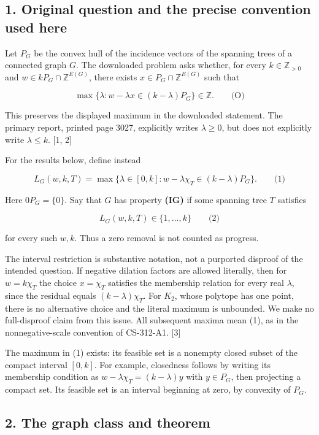 \documentclass{article}
\begin{document}
\subsection{1. Original question and the precise convention used here}

Let \(P_G\) be the convex hull of the incidence vectors of the spanning trees of a connected graph \(G\). The downloaded problem asks whether, for every \(k\in\mathbb Z_{\gt 0}\) and \(w\in kP_G\cap\mathbb Z^{E(G)}\), there exists \(x\in P_G\cap\mathbb Z^{E(G)}\) such that

\[
\max\{\lambda:w-\lambda x\in(k-\lambda)P_G\}\in\mathbb Z.\qquad\text{(O)}
\]

This preserves the displayed maximum in the downloaded statement. The primary report, printed page 3027, explicitly writes \(\lambda\ge0\), but does not explicitly write \(\lambda\le k\). [1, 2]

For the results below, define instead

\[
L_G(w,k,T)=\max\{\lambda\in[0,k]:
w-\lambda\chi_T\in(k-\lambda)P_G\}.\qquad\text{(1)}
\]

Here \(0P_G=\{0\}\). Say that \(G\) has property \textbf{(IG)} if some spanning tree \(T\) satisfies

\[
L_G(w,k,T)\in\{1,\ldots,k\}\qquad\text{(2)}
\]

for every such \(w,k\). Thus a zero removal is not counted as progress.

The interval restriction is substantive notation, not a purported disproof of the intended question. If negative dilation factors are allowed literally, then for \(w=k\chi_T\) the choice \(x=\chi_T\) satisfies the membership relation for every real \(\lambda\), since the residual equals \((k-\lambda)\chi_T\). For \(K_2\), whose polytope has one point, there is no alternative choice and the literal maximum is unbounded. We make no full-disproof claim from this issue. All subsequent maxima mean (1), as in the nonnegative-scale convention of CS-312-A1. [3]

The maximum in (1) exists: its feasible set is a nonempty closed subset of the compact interval \([0,k]\). For example, closedness follows by writing its membership condition as \(w-\lambda\chi_T=(k-\lambda)y\) with \(y\in P_G\), then projecting a compact set. Its feasible set is an interval beginning at zero, by convexity of \(P_G\).

\subsection{2. The graph class and theorem}
\end{document}
